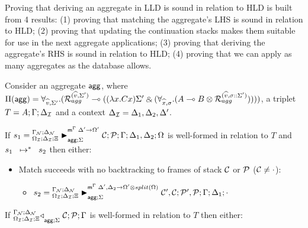 
Proving that deriving an aggregate in LLD is sound in relation to HLD is built
from 4 results: (1) proving that matching the aggregate's LHS is sound in
relation to HLD; (2) proving that updating the continuation stacks makes them
suitable for use in the next aggregate applications; (3) proving that deriving
the aggregate's RHS is sound in relation to HLD; (4) proving that we can
apply as many aggregates as the database allows.

\begin{lemma}\label{thm:aggregate_body_match}
Consider an aggregate $\m{agg}$, where $\Pi(\m{agg}) = \forall_{\widehat{v}, \Sigma'}.
   (\defstwo{agg}{\widehat{v}}{\Sigma'} \lolli ((\lambda x. C x)\Sigma' \with (\forall_{\widehat{x}, \sigma}.
                                                (A \lolli B \otimes
                                                 \defstwo{agg}{\widehat{v}}{\sigma
                                                 ::\Sigma'}))))$,
a triplet $T = A; \Gamma; \deltan$ and a context $\deltan = \Delta_1,
  \Delta_2, \Delta'$.

  If $s_1 = \matstatea{\deltan}{\lstack{C};
      \lstack{P}}{\Gamma}{\Delta_1, \Delta_2}{\Omega}{\Delta' \rightarrow
         \Omega'}{\Sigma}$ is well-formed in relation to $T$ and
         $\transs{s_1}{s_2}$ then either:

\begin{itemize}[leftmargin=*]
   \item Match succeeds with no backtracking to frames of stack $\lstack{C}$
   or $\lstack{P}$ ($\lstack{C} \neq \cdot$):

   \begin{itemize}[leftmargin=\secondm]
      \item $s_2 = \matstatea{\deltan}{\lstack{C'}, \lstack{C}; \lstack{P'},
         \lstack{P}}{\Gamma}{\Delta_1}{\cdot}{\Delta', \Delta_2 \rightarrow \Omega' \otimes split(\Omega)}{\Sigma}$
   \end{itemize}

   

\end{itemize}

If $\contstatea{\deltan}{\lstack{C}; \lstack{P}}{\Gamma}{\Sigma}$ is
well-formed in relation to $T$ then either:

\begin{itemize}[leftmargin=*]
   
\end{itemize}
\end{lemma}

